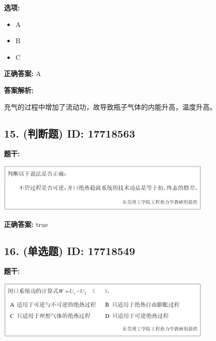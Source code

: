 \documentclass[12pt]{article}
\begin{document}
\textbf{选项:}
\begin{itemize}[leftmargin=*]
  \item A

  \item B

  \item C

\end{itemize}

\textbf{正确答案:}
A

\textbf{答案解析:}

充气的过程中增加了流动功，故导致瓶子气体的内能升高，温度升高。

\vspace{0.5em}\hrulefill\vspace{1em}

\subsection*{15. (判断题) \small ID: 17718563}

\textbf{题干:}


\begin{center}\includegraphics[width=0.8\textwidth, height=0.25\textheight, keepaspectratio]{question_15_17718563/title_img_1.png}\end{center}

\textbf{正确答案:}
true

\vspace{0.5em}\hrulefill\vspace{1em}

\subsection*{16. (单选题) \small ID: 17718549}

\textbf{题干:}


\begin{center}\includegraphics[width=0.8\textwidth, height=0.25\textheight, keepaspectratio]{question_16_17718549/title_img_1.png}\end{center}
\end{document}
